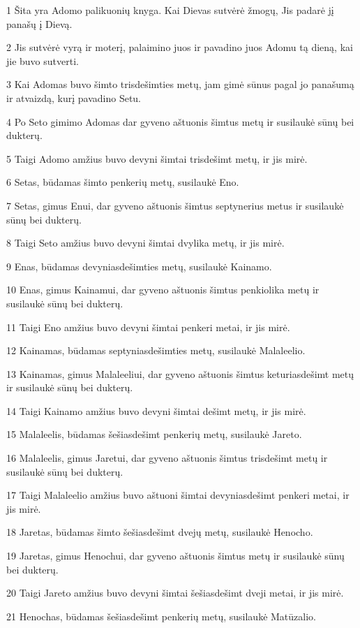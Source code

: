 \par 1 Šita yra Adomo palikuonių knyga. Kai Dievas sutvėrė žmogų, Jis padarė jį panašų į Dievą. 
\par 2 Jis sutvėrė vyrą ir moterį, palaimino juos ir pavadino juos Adomu tą dieną, kai jie buvo sutverti. 
\par 3 Kai Adomas buvo šimto trisdešimties metų, jam gimė sūnus pagal jo panašumą ir atvaizdą, kurį pavadino Setu. 
\par 4 Po Seto gimimo Adomas dar gyveno aštuonis šimtus metų ir susilaukė sūnų bei dukterų. 
\par 5 Taigi Adomo amžius buvo devyni šimtai trisdešimt metų, ir jis mirė. 
\par 6 Setas, būdamas šimto penkerių metų, susilaukė Eno. 
\par 7 Setas, gimus Enui, dar gyveno aštuonis šimtus septynerius metus ir susilaukė sūnų bei dukterų. 
\par 8 Taigi Seto amžius buvo devyni šimtai dvylika metų, ir jis mirė. 
\par 9 Enas, būdamas devyniasdešimties metų, susilaukė Kainamo. 
\par 10 Enas, gimus Kainamui, dar gyveno aštuonis šimtus penkiolika metų ir susilaukė sūnų bei dukterų. 
\par 11 Taigi Eno amžius buvo devyni šimtai penkeri metai, ir jis mirė. 
\par 12 Kainamas, būdamas septyniasdešimties metų, susilaukė Malaleelio. 
\par 13 Kainamas, gimus Malaleeliui, dar gyveno aštuonis šimtus keturiasdešimt metų ir susilaukė sūnų bei dukterų. 
\par 14 Taigi Kainamo amžius buvo devyni šimtai dešimt metų, ir jis mirė. 
\par 15 Malaleelis, būdamas šešiasdešimt penkerių metų, susilaukė Jareto. 
\par 16 Malaleelis, gimus Jaretui, dar gyveno aštuonis šimtus trisdešimt metų ir susilaukė sūnų bei dukterų. 
\par 17 Taigi Malaleelio amžius buvo aštuoni šimtai devyniasdešimt penkeri metai, ir jis mirė. 
\par 18 Jaretas, būdamas šimto šešiasdešimt dvejų metų, susilaukė Henocho. 
\par 19 Jaretas, gimus Henochui, dar gyveno aštuonis šimtus metų ir susilaukė sūnų bei dukterų. 
\par 20 Taigi Jareto amžius buvo devyni šimtai šešiasdešimt dveji metai, ir jis mirė. 
\par 21 Henochas, būdamas šešiasdešimt penkerių metų, susilaukė Matūzalio. 

